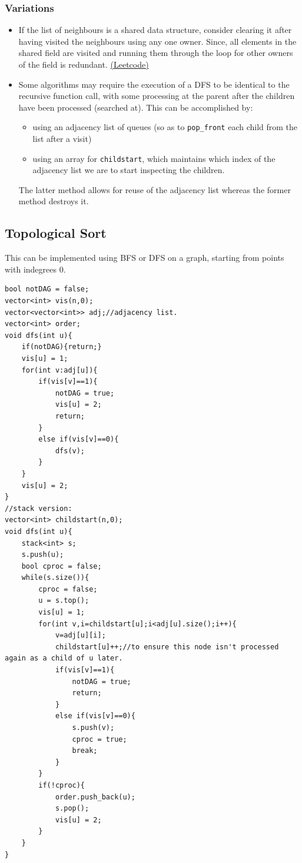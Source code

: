 \documentclass{report}
\begin{document}
\subsubsection*{Variations}
\begin{itemize}
    \item If the list of neighbours is a shared data structure, consider clearing it after having visited
    the neighbours using any one owner. Since, all elements in the shared field are visited and running them
    through the loop for other owners of the field is redundant. \href{https://leetcode.com/problems/jump-game-iv/}{(Leetcode)}
    \item Some algorithms may require the execution of a DFS to be identical to the recursive function call, with some processing at the parent after the children have been processed (searched at). This can be accomplished by: 
    \begin{itemize}
        \item using an adjacency list of queues (so as to \texttt{pop\_front} each child from the list after a visit)
        \item using an array for \texttt{childstart}, which maintains which index of the adjacency list we are to start inspecting the children.
    \end{itemize} 
    The latter method allows for reuse of the adjacency list whereas the former method destroys it.
\end{itemize}
\subsection{Topological Sort}
This can be implemented using BFS or DFS on a graph, starting from points with indegrees 0.
\begin{lstlisting}[caption=DFS implementation]
bool notDAG = false;
vector<int> vis(n,0);
vector<vector<int>> adj;//adjacency list.
vector<int> order;
void dfs(int u){
    if(notDAG){return;}
    vis[u] = 1;
    for(int v:adj[u]){
        if(vis[v]==1){
            notDAG = true;
            vis[u] = 2;
            return;
        }
        else if(vis[v]==0){
            dfs(v);
        }
    }
    vis[u] = 2;
}
//stack version:
vector<int> childstart(n,0);
void dfs(int u){
    stack<int> s;
    s.push(u);
    bool cproc = false;
    while(s.size()){
        cproc = false;
        u = s.top();
        vis[u] = 1;
        for(int v,i=childstart[u];i<adj[u].size();i++){
            v=adj[u][i];
            childstart[u]++;//to ensure this node isn't processed again as a child of u later.
            if(vis[v]==1){
                notDAG = true;
                return;
            }
            else if(vis[v]==0){
                s.push(v);
                cproc = true;
                break;
            }
        }
        if(!cproc){
            order.push_back(u);
            s.pop();
            vis[u] = 2;
        }
    }
}
\end{lstlisting}
\end{document}
